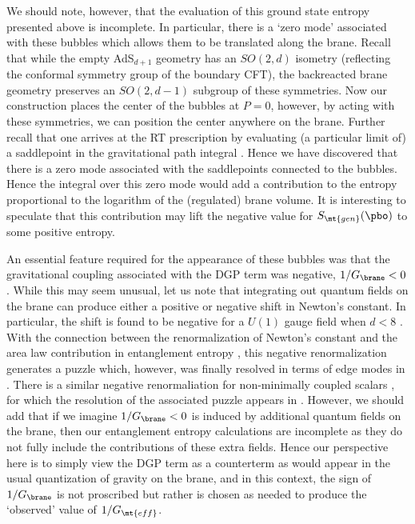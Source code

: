 We should note, however, that the evaluation of this ground state entropy presented above is incomplete. In particular, there is a `zero mode' associated with these bubbles which allows them to be translated along the brane. Recall that while the empty AdS$_{d+1}$ geometry has an $SO(2,d)$ isometry (reflecting the conformal symmetry group of the boundary CFT), the backreacted brane geometry preserves an $SO(2,d-1)$ subgroup of these symmetries. Now our construction places the center of the bubbles at $P=0$, however, by acting with these symmetries, we can position the center anywhere on the brane. Further recall that one arrives at the RT prescription by evaluating (a particular limit of) a saddlepoint in the gravitational path integral \cite{Lewkowycz:2013nqa}. Hence we have discovered that there is a zero mode associated with the saddlepoints connected to the bubbles. Hence the integral over this zero mode would add a contribution to the entropy proportional to the logarithm of the (regulated) brane volume. It is interesting to speculate that this contribution may lift the negative value for $S_\mt{gen}(\pbo)$ to some positive entropy.

An essential feature required for the appearance of these bubbles was that the gravitational coupling associated with the DGP term  was negative, \ie $1/G_\brane<0$. While this may seem unusual, let us note that integrating out quantum fields on the brane can produce either a positive or negative shift in Newton's constant. In particular, the shift is found to be negative for a $U(1)$ gauge field when $d<8$ \cite{Larsen:1995ax,Kabat:1995eq}. With the connection between the renormalization of Newton's constant and the area law contribution in entanglement entropy \cite{Callan:1994py,Susskind:1994sm}, this negative renormalization generates a puzzle which, however,  was finally resolved in terms of edge modes in \cite{Donnelly:2014fua,Donnelly:2015hxa}. There is a similar negative renormaliation for non-minimally coupled scalars \cite{Larsen:1995ax}, for which the resolution of the associated puzzle appears  in \cite{Faulkner:2013ana}. However, we should add that if we imagine $1/G_\brane<0$ is induced by additional quantum fields on the brane, then our entanglement entropy calculations are incomplete as they do not fully include the contributions of these extra fields. Hence our perspective here is to simply view the DGP term as a counterterm as would appear in the usual quantization of gravity on the brane, and in this context, the sign of $1/G_\brane$ is not proscribed but rather is chosen as needed to produce the `observed' value of $1/G_\mt{eff}$.

